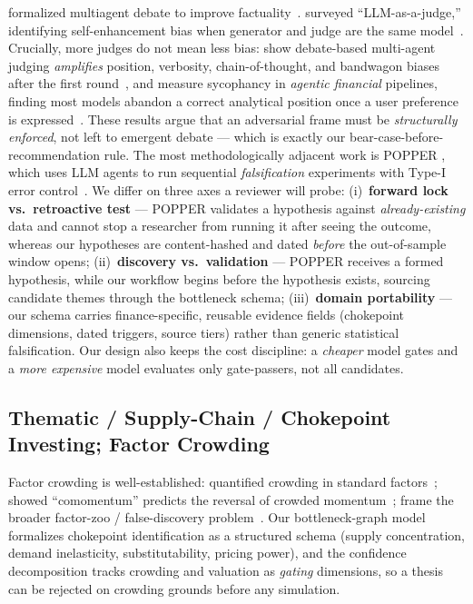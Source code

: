 \documentclass[11pt]{article}
\begin{document}
\citet{du2024multiagentdebate} formalized multiagent debate to improve
factuality~\citep{du2024multiagentdebate}. \citet{li2025llmjudge} surveyed
``LLM-as-a-judge,'' identifying self-enhancement bias when generator and judge
are the same model~\citep{li2025llmjudge}. Crucially, more judges do not mean
less bias: \citet{ma2025judging} show debate-based multi-agent judging
\emph{amplifies} position, verbosity, chain-of-thought, and bandwagon biases
after the first round~\citep{ma2025judging}, and \citet{zhao2026priceofagreement}
measure sycophancy in \emph{agentic financial} pipelines, finding most models
abandon a correct analytical position once a user preference is
expressed~\citep{zhao2026priceofagreement}. These results argue that an
adversarial frame must be \emph{structurally enforced}, not left to emergent
debate --- which is exactly our bear-case-before-recommendation rule. The most
methodologically adjacent work is POPPER \citep{huang2025popper}, which uses
LLM agents to run sequential \emph{falsification} experiments with Type-I error
control~\citep{huang2025popper}. We differ on three axes a reviewer will probe:
(i)~\textbf{forward lock vs.\ retroactive test} --- POPPER validates a
hypothesis against \emph{already-existing} data and cannot stop a researcher
from running it after seeing the outcome, whereas our hypotheses are
content-hashed and dated \emph{before} the out-of-sample window opens;
(ii)~\textbf{discovery vs.\ validation} --- POPPER receives a formed
hypothesis, while our workflow begins before the hypothesis exists, sourcing
candidate themes through the bottleneck schema; (iii)~\textbf{domain
portability} --- our schema carries finance-specific, reusable evidence fields
(chokepoint dimensions, dated triggers, source tiers) rather than generic
statistical falsification. Our design also keeps the cost discipline: a
\emph{cheaper} model gates and a \emph{more expensive} model evaluates only
gate-passers, not all candidates.

\subsection{Thematic / Supply-Chain / Chokepoint Investing; Factor Crowding}

Factor crowding is well-established: \citet{volpati2020crowding} quantified
crowding in standard factors~\citep{volpati2020crowding};
\citet{lou2022comomentum} showed ``comomentum'' predicts the reversal of
crowded momentum~\citep{lou2022comomentum}; \citet{harvey2016crosssection}
frame the broader factor-zoo / false-discovery
problem~\citep{harvey2016crosssection}. Our bottleneck-graph model formalizes
chokepoint identification as a structured schema (supply concentration, demand
inelasticity, substitutability, pricing power), and the confidence
decomposition tracks crowding and valuation as \emph{gating} dimensions, so a
thesis can be rejected on crowding grounds before any simulation.
\end{document}
